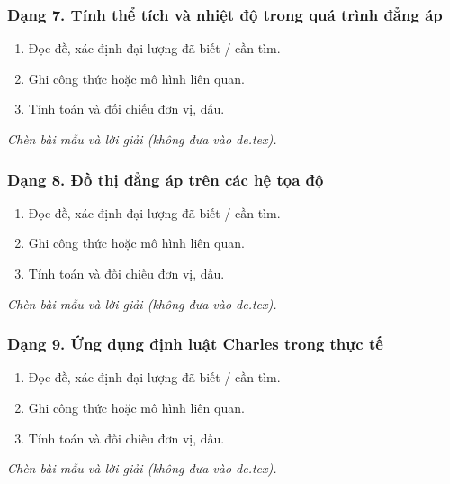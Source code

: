 \subsubsection{Dạng 7. Tính thể tích và nhiệt độ trong quá trình đẳng áp}
\begin{phuongphap}
\begin{enumerate}
\item Đọc đề, xác định đại lượng đã biết / cần tìm.
\item Ghi công thức hoặc mô hình liên quan.
\item Tính toán và đối chiếu đơn vị, dấu.
\end{enumerate}
\end{phuongphap}
\begin{vidumau}
\textit{Chèn bài mẫu và lời giải (không đưa vào de.tex).}
\end{vidumau}

\subsubsection{Dạng 8. Đồ thị đẳng áp trên các hệ tọa độ}
\begin{phuongphap}
\begin{enumerate}
\item Đọc đề, xác định đại lượng đã biết / cần tìm.
\item Ghi công thức hoặc mô hình liên quan.
\item Tính toán và đối chiếu đơn vị, dấu.
\end{enumerate}
\end{phuongphap}
\begin{vidumau}
\textit{Chèn bài mẫu và lời giải (không đưa vào de.tex).}
\end{vidumau}

\subsubsection{Dạng 9. Ứng dụng định luật Charles trong thực tế}
\begin{phuongphap}
\begin{enumerate}
\item Đọc đề, xác định đại lượng đã biết / cần tìm.
\item Ghi công thức hoặc mô hình liên quan.
\item Tính toán và đối chiếu đơn vị, dấu.
\end{enumerate}
\end{phuongphap}
\begin{vidumau}
\textit{Chèn bài mẫu và lời giải (không đưa vào de.tex).}
\end{vidumau}

